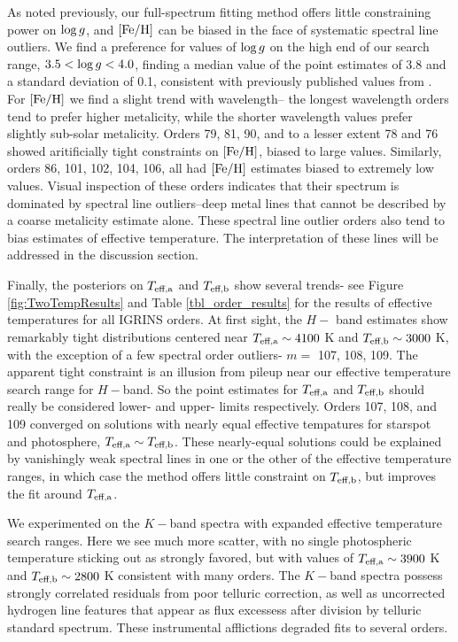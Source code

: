 \documentclass[onecolumn]{emulateapj}%
\begin{document}
As noted previously, our full-spectrum fitting method offers little constraining power on $\log g$, and $[{\rm Fe}/{\rm H}]$ can be biased in the face of systematic spectral line outliers.  We find a preference for values of $\log g$ on the high end of our search range, $3.5 <\log g <4.0$, finding a median value of the point estimates of 3.8 and a standard deviation of 0.1, consistent with previously published values from \citet{2014MNRAS.444.3220D}.  For $[{\rm Fe}/{\rm H}]$ we find a slight trend with wavelength-- the longest wavelength orders tend to prefer higher metalicity, while the shorter wavelength values prefer slightly sub-solar metalicity.  Orders 79, 81, 90, and to a lesser extent 78 and 76 showed aritificially tight constraints on $[{\rm Fe}/{\rm H}]$, biased to large values.  Similarly, orders 86, 101, 102, 104, 106, all had $[{\rm Fe}/{\rm H}]$ estimates biased to extremely low values.   Visual inspection of these orders indicates that their spectrum is dominated by spectral line outliers--deep metal lines that cannot be described by a coarse metalicity estimate alone.  These spectral line outlier orders also tend to bias estimates of effective temperature.  The interpretation of these lines will be addressed in the discussion section.  

Finally, the posteriors on $T_\textrm{eff,a}$ and $T_\textrm{eff,b}$ show several trends- see Figure \ref{fig:TwoTempResults} and Table \ref{tbl_order_results} for the results of effective temperatures for all IGRINS orders.  At first sight, the $H-$ band estimates show remarkably tight distributions centered near $T_\textrm{eff,a}\sim4100$ K and $T_\textrm{eff,b}\sim3000$ K, with the exception of a few spectral order outliers- $m=$ 107, 108, 109. The apparent tight constraint is an illusion from pileup near our effective temperature search range for $H-$band.  So the point estimates for $T_\textrm{eff,a}$ and $T_\textrm{eff,b}$ should really be considered lower- and upper- limits respectively.  Orders 107, 108, and 109 converged on solutions with nearly equal effective tempatures for starspot and photosphere, $T_\textrm{eff,a} \sim T_\textrm{eff,b}$.  These nearly-equal solutions could be explained by vanishingly weak spectral lines in one or the other of the effective temperature ranges, in which case the method offers little constraint on $T_\textrm{eff,b}$, but improves the fit around $T_\textrm{eff,a}$.  

We experimented on the $K-$band spectra with expanded effective temperature search ranges.  Here we see much more scatter, with no single photospheric temperature sticking out as strongly favored, but with values of $T_\textrm{eff,a} \sim 3900$ K and $T_\textrm{eff,b} \sim 2800$ K consistent with many orders.  The $K-$band spectra possess strongly correlated residuals from poor telluric correction, as well as uncorrected hydrogen line features that appear as flux excessess after division by telluric standard spectrum.  These instrumental afflictions degraded fits to several orders.
\end{document}

